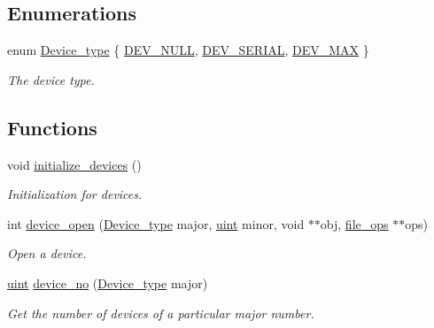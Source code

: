 \subsection*{Enumerations}
\begin{DoxyCompactItemize}
\item 
enum \hyperlink{group__dev_ga879ceac20e83b2375e5b49f4379b0c90}{Device\+\_\+type} \{ \hyperlink{group__dev_gga879ceac20e83b2375e5b49f4379b0c90a8ca9ed7c2fc080b6706582ccf828b08f}{D\+E\+V\+\_\+\+N\+U\+LL}, 
\hyperlink{group__dev_gga879ceac20e83b2375e5b49f4379b0c90adb43c91cf279ccd4510abaed9425bacc}{D\+E\+V\+\_\+\+S\+E\+R\+I\+AL}, 
\hyperlink{group__dev_gga879ceac20e83b2375e5b49f4379b0c90a4d07dfbc7e68d26e2d92773a37381ce7}{D\+E\+V\+\_\+\+M\+AX}
 \}\begin{DoxyCompactList}\small\item\em The device type. \end{DoxyCompactList}
\end{DoxyCompactItemize}
\subsection*{Functions}
\begin{DoxyCompactItemize}
\item 
void \hyperlink{group__dev_ga840b5c2460abea4a19a201f7d6d035c8}{initialize\+\_\+devices} ()
\begin{DoxyCompactList}\small\item\em Initialization for devices. \end{DoxyCompactList}\item 
int \hyperlink{group__dev_ga6d8e08550640c9819aa07b6bba9fa6ed}{device\+\_\+open} (\hyperlink{group__dev_ga879ceac20e83b2375e5b49f4379b0c90}{Device\+\_\+type} major, \hyperlink{bios_8h_a91ad9478d81a7aaf2593e8d9c3d06a14}{uint} minor, void $\ast$$\ast$obj, \hyperlink{group__dev_gaab625d8ae3a95e942ed10ed1579f5042}{file\+\_\+ops} $\ast$$\ast$ops)
\begin{DoxyCompactList}\small\item\em Open a device. \end{DoxyCompactList}\item 
\hyperlink{bios_8h_a91ad9478d81a7aaf2593e8d9c3d06a14}{uint} \hyperlink{group__dev_ga0808cf584a510e0eff6908a5313ce296}{device\+\_\+no} (\hyperlink{group__dev_ga879ceac20e83b2375e5b49f4379b0c90}{Device\+\_\+type} major)
\begin{DoxyCompactList}\small\item\em Get the number of devices of a particular major number. \end{DoxyCompactList}\end{DoxyCompactItemize}


